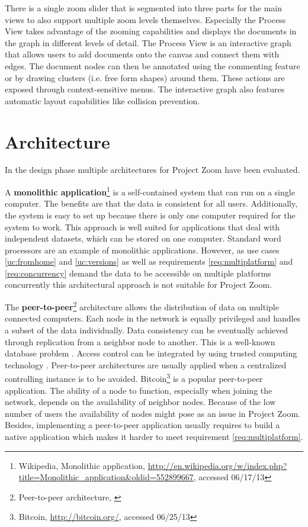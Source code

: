 There is a single zoom slider that is segmented into three parts for the main views to also support multiple zoom levels themselves. Especially the Process View takes advantage of the zooming capabilities and displays the documents in the graph in different levels of detail. 
The Process View is an interactive graph that allows users to add documents onto the canvas and connect them with edges. The document nodes can then be annotated using the commenting feature or by drawing clusters (i.e. free form shapes) around them. These actions are exposed through context-sensitive menus. The interactive graph also features automatic layout capabilities like collision prevention.

\section{Architecture}
In the design phase multiple architectures for Project Zoom have been evaluated. 

A \textbf{monolithic application}\footnote{Wikipedia, Monolithic application, \url{http://en.wikipedia.org/w/index.php?title=Monolithic_application&oldid=552899667}, accessed 06/17/13} is a self-contained system that can run on a single computer. The benefits are that the data is consistent for all users. Additionally, the system is easy to set up because there is only one computer required for the system to work. This approach is well suited for applications that deal with independent datasets, which can be stored on one computer. Standard word processors are an example of monolithic applications. However, as use cases \ref{uc:fromhome} and \ref{uc:versions} as well as requirements \ref{req:multiplatform} and \ref{req:concurrency} demand the data to be accessible on multiple platforms concurrently this architectural approach is not suitable for Project Zoom.

The \textbf{peer-to-peer}\footnote{Peer-to-peer architecture, \cite{Schollmeier_2001}} architecture allows the distribution of data on multiple connected computers. Each node in the network is equally privileged and handles a subset of the data individually. Data consistency can be eventually achieved through replication from a neighbor node to another. This is a well-known database problem \cite{Gray_1996}. Access control can be integrated by using trusted computing technology \cite{Sandhu_2005}. Peer-to-peer architectures are usually applied when a centralized controlling instance is to be avoided. Bitcoin\footnote{Bitcoin, \url{http://bitcoin.org/}, accessed 06/25/13} is a popular peer-to-peer application. The ability of a node to function, especially when joining the network, depends on the availability of neighbor nodes. Because of the low number of users the availability of nodes might pose as an issue in Project Zoom. Besides, implementing a peer-to-peer application usually requires to build a native application which makes it harder to meet requirement \ref{req:multiplatform}.

